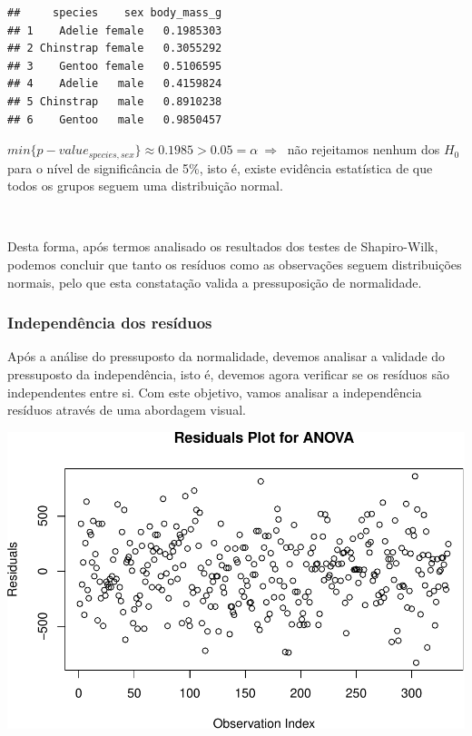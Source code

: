\documentclass[]{article}
\begin{document}
\begin{verbatim}
##     species    sex body_mass_g
## 1    Adelie female   0.1985303
## 2 Chinstrap female   0.3055292
## 3    Gentoo female   0.5106595
## 4    Adelie   male   0.4159824
## 5 Chinstrap   male   0.8910238
## 6    Gentoo   male   0.9850457
\end{verbatim}

\(min\{p-value_{species,sex}\} \approx 0.1985 > 0.05 = \alpha\ \Rightarrow\ \)
não rejeitamos nenhum dos \(H_0\) para o nível de significância de 5\%,
isto é, existe evidência estatística de que todos os grupos seguem uma
distribuição normal.

\(\ \)

Desta forma, após termos analisado os resultados dos testes de
Shapiro-Wilk, podemos concluir que tanto os resíduos como as observações
seguem distribuições normais, pelo que esta constatação valida a
pressuposição de normalidade.

\subsubsection{Independência dos resíduos}

Após a análise do pressuposto da normalidade, devemos analisar a
validade do pressuposto da independência, isto é, devemos agora
verificar se os resíduos são independentes entre si. Com este objetivo,
vamos analisar a independência resíduos através de uma abordagem visual.

\begin{Shaded}
\begin{Highlighting}[]
\NormalTok{(} \NormalTok{, } \NormalTok{,}
      \NormalTok{)}
\end{Highlighting}
\end{Shaded}

\includegraphics{AEII_main_files/figure-latex/unnamed-chunk-9-1.pdf}
\end{document}
